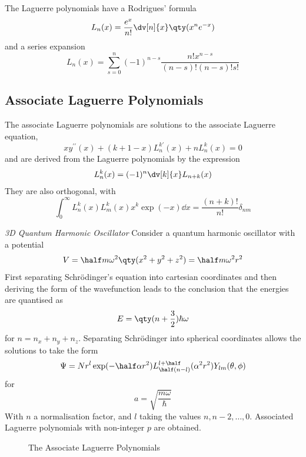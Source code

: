 The Laguerre polynomials have a Rodrigues' formula
\begin{equation}
  \label{eq:rodrigueslag}
  L_n(x) = \frac{e^x}{n!} \dv[n]{x} \qty(x^n e^{-x} )
\end{equation}
and a series expansion
\begin{equation}
  \label{eq:serieslag}
  L_n(x) = \sum_{s=0}^n (-1)^{n-s} \frac{n! x^{n-s}}{(n-s)!(n-s)!s!}
\end{equation}

\subsection{Associate Laguerre Polynomials}
\label{sec:assoc-lagu-polyn}

The associate Laguerre polynomials are solutions to the associate
Laguerre equation,
\begin{equation}
  \label{eq:assoclag}
  x y^{\prime \prime} (x) + (k+1-x) L_n^{k \prime}(x) + nL_n^k(x) = 0
\end{equation}
and are derived from the Laguerre polynomials by the expression
\begin{equation}
  \label{eq:assoclagfromlag}
  L_n^k(x) = (-1)^n \dv[k]{x} L_{n+k}(x)
\end{equation}
They are also orthogonal, with
\begin{equation}
  \label{eq:assoclagortho}
  \int_0^{\infty} L_n^k(x) L_m^k(x) x^k \exp(-x) \dd{x} = \frac{(n+k)!}{n!} \delta_{nm}
\end{equation}

\begin{example}{\em 3D Quantum Harmonic Oscillator}
  Consider a quantum harmonic oscillator with a potential
  \[ V = \half m \omega^2 \qty(x^2+y^2+z^2) = \half m \omega^2 r^2 \]
  First separating Schr\"odinger's equation into cartesian coordinates
  and then deriving the form of the wavefunction leads to the
  conclusion that the energies are quantised as
  \[ E = \qty( n+ \frac{3}{2}) \hbar \omega \] for $n = n_x + n_y +
  n_z$.  Separating Schr\"odinger into spherical coordinates allows
  the solutions to take the form
  \[ \Psi = N r^l \exp( - \half \alpha r^2) L_{\half(n-l)}^{l+\half}
  (\alpha^2 r^2) Y_{lm}(\theta, \phi) \] for \[ a = \sqrt{\frac{m
      \omega}{\hbar}} \] With $n$ a normalisation factor, and $l$
  taking the values $n, n-2, \dots, 0$.  Associated Laguerre
  polynomials with non-integer $p$ are obtained.
\end{example}

\begin{figure}
  \centering
  
  \caption{The Associate Laguerre Polynomials}
\end{figure}


